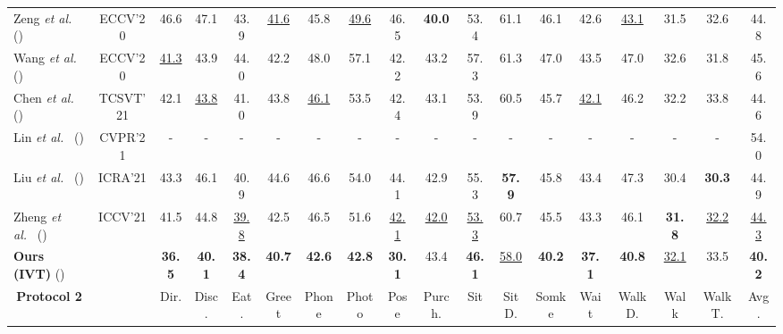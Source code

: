 \documentclass[sigconf]{acmart}
\newcommand{\etal}{\textit{et al.~}}
\begin{document}
\begin{table*}[!t]
{\begin{tabular}{lccccccccccccccccc}
\multicolumn{1}{l|}{Zeng \etal \cite{zeng2020srnet}  ()} & \multicolumn{1}{c|}{ECCV'20} & 46.6 & 47.1  & 43.9 &\underline{ 41.6} & 45.8 & \underline{49.6} & 46.5 & \textbf{40.0} & 53.4 & 61.1  & 46.1  & 42.6 & \underline{43.1} & 31.5 & \multicolumn{1}{c|}{32.6}  & 44.8   \\

\multicolumn{1}{l|}{Wang \etal \cite{wang2020motion} ()}    & \multicolumn{1}{c|}{ECCV'20}  & \underline{41.3} & 43.9  & 44.0 & 42.2  & 48.0  & 57.1  & 42.2 & 43.2   & 57.3 & 61.3  & 47.0  & 43.5 & 47.0  & 32.6 & \multicolumn{1}{c|}{31.8}   & 45.6    \\

\multicolumn{1}{l|}{Chen \etal \cite{chen2021anatomy} ()}  & \multicolumn{1}{c|}{TCSVT'21}  & 42.1 & \underline{43.8} & 41.0 & 43.8  & \underline{46.1}  & 53.5  & 42.4 & 43.1   & 53.9 & {60.5}  & 45.7  &\underline{ 42.1} & 46.2   & {32.2} & \multicolumn{1}{c|}{33.8}   & 44.6    \\
\hline
\multicolumn{1}{l|}{Lin \etal \cite{lin2021end} ()}    & \multicolumn{1}{c|}{CVPR'21}    & -    & -     & -    & -     & -     & -     & -    & -      & -    & -     & -     & -    & -      & -    & \multicolumn{1}{c|}{-}      & 54.0 \\
\multicolumn{1}{l|}{Liu \etal \cite{liu2020attention} ()}    & \multicolumn{1}{c|}{ICRA'21} & 43.3 & 46.1 & 40.9 & 44.6 & 46.6 & 54.0 & 44.1 & 42.9 & 55.3  & \textbf{57.9} & 45.8 & 43.4 & 47.3  & 30.4 & \multicolumn{1}{c|}{\textbf{30.3}} & 44.9 \\

\multicolumn{1}{l|}{Zheng \etal \cite{zheng20213d} ()} & \multicolumn{1}{c|}{ICCV'21}  & 41.5 & 44.8  & \underline{39.8} & 42.5  & 46.5  & 51.6  & \underline{42.1} & \underline{42.0}   & \underline{53.3} & 60.7  & 45.5  & 43.3 & 46.1   & \textbf{31.8} & \multicolumn{1}{c|}{\underline{32.2}}   &\underline{44.3}    \\ 
\hline
\multicolumn{1}{l|}{\textbf{Ours (IVT)} ()} & \multicolumn{1}{c|}{}  &  \textbf{36.5} & \textbf{40.1} &  \textbf{38.4} & \textbf{40.7} & \textbf{42.6} & \textbf{42.8} & \textbf{30.1} & 43.4 & \textbf{46.1} & \underline{58.0} & \textbf{40.2} & \textbf{37.1} & \textbf{40.8} & \underline{32.1} & \multicolumn{1}{c|}{33.5} & \textbf{40.2}  \\
\hline

\hline
\multicolumn{1}{c|}{\textbf{Protocol 2}}       & \multicolumn{1}{c|}{}        & Dir. & Disc. & Eat. & Greet & Phone & Photo & Pose & Purch. & Sit  & SitD. & Somke & Wait & WalkD. & Walk & \multicolumn{1}{c|}{WalkT.} & Avg. \\ 
\hline


\end{tabular}}
\end{table*}
\end{document}
